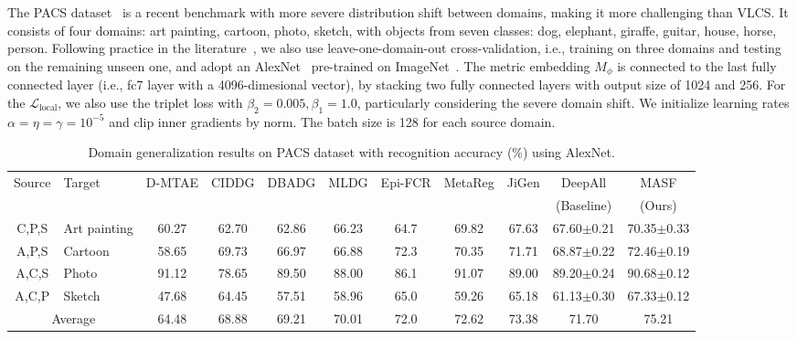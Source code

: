 \documentclass{article}
\newcommand{\MetricLoss}{\mathcal{L}_\mathrm{local}}
\newcommand\Tstrut{\rule{0pt}{2.6ex}}         \newcommand\Bstrut{\rule[-0.9ex]{0pt}{0pt}}
\begin{document}
The PACS dataset~\citep{li2017deeper} is a recent benchmark with more severe distribution shift between domains, making it more challenging than VLCS. It consists of four domains: art painting, cartoon, photo, sketch, with objects from seven classes: dog, elephant, giraffe, guitar, house, horse, person.
Following practice in the literature~\citep{balaji2018metareg,carlucci2019domain,li2018learning,li2019episodic}, we also use leave-one-domain-out cross-validation, i.e., training on three domains and testing on the remaining unseen one, and adopt an AlexNet~\citep{krizhevsky2012imagenet} pre-trained on ImageNet~\citep{ILSVRC15}. The metric embedding $M_\phi$ is connected to the last fully connected layer (i.e., fc7 layer with a 4096-dimesional vector), by stacking two fully connected layers with output size of 1024 and 256.
For the $\MetricLoss$, we also use the triplet loss with $\beta_2=0.005, \beta_1=1.0$, particularly considering the severe domain shift.
We initialize learning rates $\alpha=\eta=\gamma=10^{-5}$ and clip inner gradients by norm. The batch size is 128 for each source domain.

\begin{table}[t]
\centering
    \caption{Domain generalization results on PACS dataset with recognition accuracy (\%) using AlexNet.}
    \setlength{\tabcolsep}{3pt}
    \begin{adjustbox}{scale=.85}
    \begin{tabular}{cl|ccccccc|cc}
    \toprule
   \multirow{2}{*}{Source} & \multirow{ 2}{*}{Target}  & D-MTAE   & CIDDG   & DBADG & MLDG & Epi-FCR & MetaReg  & JiGen & DeepAll & MASF \\
    &  & \citep{ghifary2015domain} & \citep{li2018deep} & \cite{li2017deeper} & \citep{li2018learning}  & \cite{li2019episodic} & \citep{balaji2018metareg}  & \cite{carlucci2019domain} & (Baseline) & (Ours) \\
    \hline
{C},{P},{S}  & Art painting  & 60.27  & 62.70  & 62.86  & 66.23    & 64.7  & 69.82  & 67.63  & 67.60$\pm$0.21  & 70.35$\pm$0.33  \Tstrut  \\
{A},{P},{S}  & Cartoon       & 58.65  & 69.73  & 66.97  & 66.88    & 72.3  & 70.35  & 71.71  & 68.87$\pm$0.22  & 72.46$\pm$0.19   \\
{A},{C},{S}  & Photo         & 91.12  & 78.65  & 89.50  & 88.00    & 86.1  & 91.07  & 89.00  & 89.20$\pm$0.24  & 90.68$\pm$0.12    \\
{A},{C},{P}  & Sketch        & 47.68  & 64.45  & 57.51  & 58.96    & 65.0  & 59.26  & 65.18  & 61.13$\pm$0.30  & 67.33$\pm$0.12   \\
    \hline
\multicolumn{2}{c|}{Average} & 64.48  & 68.88  & 69.21  & 70.01   & 72.0   & 72.62  & 73.38  & 71.70  & 75.21 \Tstrut   \\
    \bottomrule
    \end{tabular}
    \end{adjustbox}
    \label{tab:pacs}
    \vspace{5mm}
\end{table}
\end{document}
